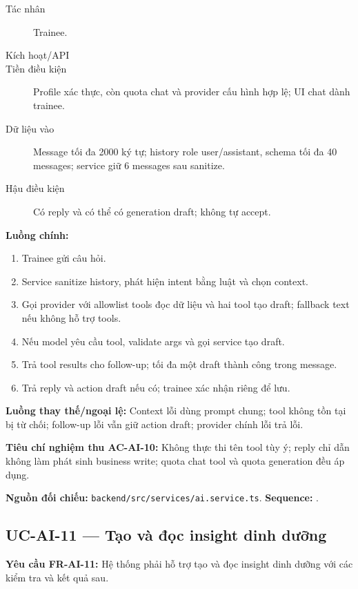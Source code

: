 \documentclass[12pt,a4paper]{article}
\newcommand{\evidence}[1]{{\small\nolinkurl{#1}}}
\begin{document}
\begin{description}
\item[Tác nhân] Trainee.
\item[Kích hoạt/API] 
\item[Tiền điều kiện] Profile xác thực, còn quota chat và provider cấu hình hợp lệ; UI chat dành trainee.
\item[Dữ liệu vào] Message tối đa 2000 ký tự; history role user/assistant, schema tối đa 40 messages; service giữ 6 messages sau sanitize.
\item[Hậu điều kiện] Có reply và có thể có generation draft; không tự accept.
\end{description}
\textbf{Luồng chính:}
\begin{enumerate}
  \item Trainee gửi câu hỏi.
  \item Service sanitize history, phát hiện intent bằng luật và chọn context.
  \item Gọi provider với allowlist tools đọc dữ liệu và hai tool tạo draft; fallback text nếu không hỗ trợ tools.
  \item Nếu model yêu cầu tool, validate args và gọi service tạo draft.
  \item Trả tool results cho follow-up; tối đa một draft thành công trong message.
  \item Trả reply và action draft nếu có; trainee xác nhận riêng để lưu.
\end{enumerate}
\textbf{Luồng thay thế/ngoại lệ:} Context lỗi dùng prompt chung; tool không tồn tại bị từ chối; follow-up lỗi vẫn giữ action draft; provider chính lỗi trả lỗi.

\textbf{Tiêu chí nghiệm thu AC-AI-10:} Không thực thi tên tool tùy ý; reply chỉ dẫn không làm phát sinh business write; quota chat tool và quota generation đều áp dụng.

\textbf{Nguồn đối chiếu:} \evidence{backend/src/services/ai.service.ts}. \textbf{Sequence:} .

\subsection{UC-AI-11 --- Tạo và đọc insight dinh dưỡng}
\label{uc-ai-11}
\textbf{Yêu cầu FR-AI-11:} Hệ thống phải hỗ trợ tạo và đọc insight dinh dưỡng với các kiểm tra và kết quả sau.
\end{document}
